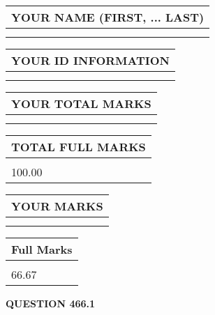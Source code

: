 \documentclass{ctexart}
\begin{document}
   
   
   
\newpage 
\setcounter{page}{ 
   466001 } 
   
   
   
   
\noindent\begin{tabular}{|l|}
\hline
YOUR NAME (FIRST, ... LAST)  \\
\hline
 \\ 
 \\ 
\hline
\end{tabular}
\hspace{0.05in} \begin{tabular}{|l|}
\hline
 YOUR   ID   INFORMATION  \\
\hline
 \\ 
 \\ 
\hline
\end{tabular}
   
   
\vspace{0.2in}\noindent\begin{tabular}{|l|}
\hline
YOUR TOTAL MARKS  \\
\hline
 \\ 
 \\ 
\hline
\end{tabular}
\hspace{0.05in} \begin{tabular}{|l|}
\hline
TOTAL FULL MARKS  \\
\hline
 \\ 
100.00 \\
\hline
\end{tabular}
   
   
 \vspace{0.2in}
 
 
 
 
   
   
  
\vspace{0.2in}
  
\noindent\begin{tabular}{|l|}
\hline
 YOUR MARKS  \\
\hline
 \\ 
 \\ 
\hline
\end{tabular}
\hspace{0.05in} \begin{tabular}{|l|}
\hline
 Full Marks  \\
\hline
 \\ 
66.67 \\
\hline
\end{tabular}
{\textbf{\Large{QUESTION
466.1 
}}}
  
\end{document}

